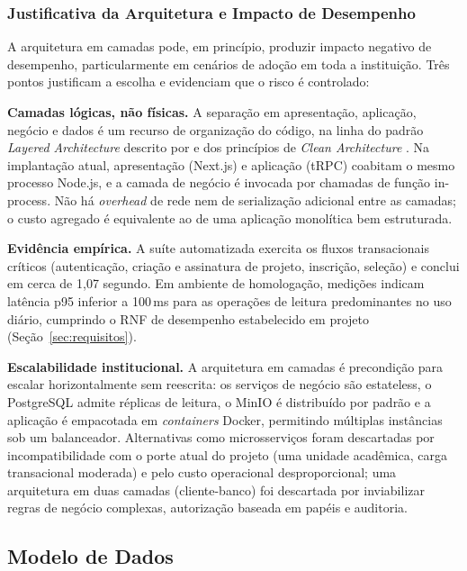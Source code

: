 \documentclass[portuguese]{sbc2025}%
\begin{document}
\subsubsection{Justificativa da Arquitetura e Impacto de Desempenho}
\label{sec:arquitetura-justificativa}

A arquitetura em camadas pode, em princípio, produzir impacto negativo de desempenho, particularmente em cenários de adoção em toda a instituição. Três pontos justificam a escolha e evidenciam que o risco é controlado:

\textbf{Camadas lógicas, não físicas.} A separação em apresentação, aplicação, negócio e dados é um recurso de organização do código, na linha do padrão \textit{Layered Architecture} descrito por \citet{Fowler2002} e dos princípios de \textit{Clean Architecture} \cite{Martin2017}. Na implantação atual, apresentação (Next.js) e aplicação (tRPC) coabitam o mesmo processo Node.js, e a camada de negócio é invocada por chamadas de função in-process. Não há \textit{overhead} de rede nem de serialização adicional entre as camadas; o custo agregado é equivalente ao de uma aplicação monolítica bem estruturada.

\textbf{Evidência empírica.} A suíte automatizada exercita os fluxos transacionais críticos (autenticação, criação e assinatura de projeto, inscrição, seleção) e conclui em cerca de 1,07 segundo. Em ambiente de homologação, medições indicam latência p95 inferior a 100\,ms para as operações de leitura predominantes no uso diário, cumprindo o RNF de desempenho estabelecido em projeto (Seção~\ref{sec:requisitos}).

\textbf{Escalabilidade institucional.} A arquitetura em camadas é precondição para escalar horizontalmente sem reescrita: os serviços de negócio são estateless, o PostgreSQL admite réplicas de leitura, o MinIO é distribuído por padrão e a aplicação é empacotada em \textit{containers} Docker, permitindo múltiplas instâncias sob um balanceador. Alternativas como microsserviços \cite{Newman2015} foram descartadas por incompatibilidade com o porte atual do projeto (uma unidade acadêmica, carga transacional moderada) e pelo custo operacional desproporcional; uma arquitetura em duas camadas (cliente-banco) foi descartada por inviabilizar regras de negócio complexas, autorização baseada em papéis e auditoria.

\subsection{Modelo de Dados}
\end{document}
